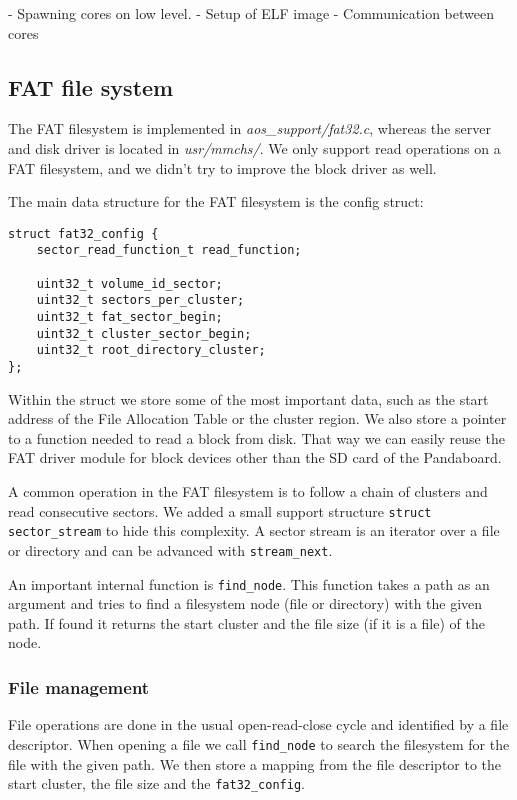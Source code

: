 \documentclass[a4paper,10pt]{article}
\newcommand{\filepath}[1]{\emph{ #1}}
\begin{document}
\todo {}

- Spawning cores on low level.
- Setup of ELF image
- Communication between cores

\subsection{FAT file system}

The FAT filesystem is implemented in \filepath{aos\_support/fat32.c}, whereas the server and disk driver is located in \filepath{usr/mmchs/}.
We only support read operations on a FAT filesystem, and we didn't try to improve the block driver as well.

The main data structure for the FAT filesystem is the config struct:

\begin{lstlisting}
struct fat32_config {
    sector_read_function_t read_function;

    uint32_t volume_id_sector;
    uint32_t sectors_per_cluster;
    uint32_t fat_sector_begin;
    uint32_t cluster_sector_begin;
    uint32_t root_directory_cluster;
};
\end{lstlisting}

Within the struct we store some of the most important data, such as the start address of the File Allocation Table or the cluster region.
We also store a pointer to a function needed to read a block from disk.
That way we can easily reuse the FAT driver module for block devices other than the SD card of the Pandaboard.

A common operation in the FAT filesystem is to follow a chain of clusters and read consecutive sectors.
We added a small support structure \lstinline!struct sector_stream! to hide this complexity.
A sector stream is an iterator over a file or directory and can be advanced with \lstinline!stream_next!.

An important internal function is \lstinline!find_node!.
This function takes a path as an argument and tries to find a filesystem node (file or directory) with the given path.
If found it returns the start cluster and the file size (if it is a file) of the node.

\subsubsection{File management}

File operations are done in the usual open-read-close cycle and identified by a file descriptor.
When opening a file we call \lstinline!find_node! to search the filesystem for the file with the given path.
We then store a mapping from the file descriptor to the start cluster, the file size and the \lstinline!fat32_config!.
\end{document}
